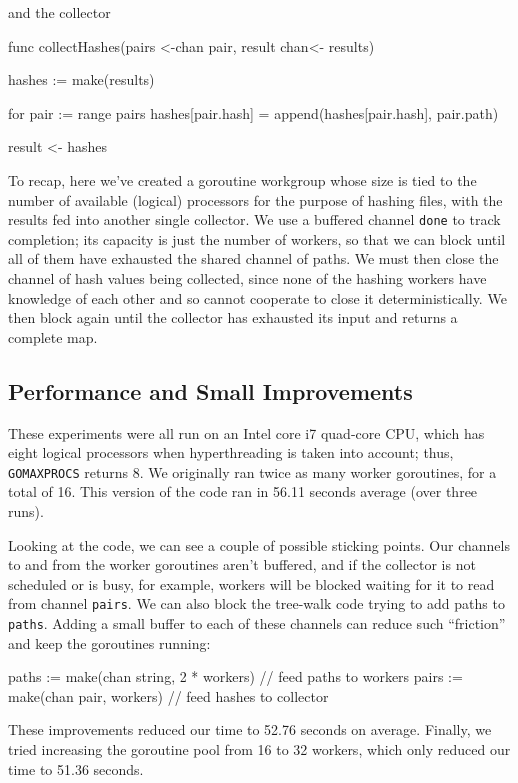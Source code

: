 \documentclass[12pt,notitlepage]{article}
\begin{document}
and the collector

\begin{golang}
func collectHashes(pairs <-chan pair, result chan<- results) {
	hashes := make(results)

	for pair := range pairs {
		hashes[pair.hash] = append(hashes[pair.hash], pair.path)
	}

	result <- hashes
}
\end{golang}

To recap, here we've created a goroutine workgroup whose size is tied to the
number of available (logical) processors for the purpose of hashing files, with
the results fed into another single collector. We use a buffered channel \verb|done|
to track completion; its capacity is just the number of workers, so that we can
block until all of them have exhausted the shared channel of paths. We must then
close the channel of hash values being collected, since none of the hashing workers
have knowledge of each other and so cannot cooperate to close it deterministically.
We then block again until the collector has exhausted its input and returns a
complete map.

\subsection{Performance and Small Improvements}
These experiments were all run on an Intel core i7 quad-core CPU, which has eight
logical processors when hyperthreading is taken into account; thus, \verb|GOMAXPROCS|
returns 8. We originally ran twice as many worker goroutines, for a total of 16.
This version of the code ran in 56.11 seconds average (over three runs).

Looking at the code, we can see a couple of possible sticking points. Our channels
to and from the worker goroutines aren't buffered, and if the collector is not
scheduled or is busy, for example, workers will be blocked waiting for it to
read from channel \verb|pairs|. We can also block the tree-walk code trying to
add paths to \verb|paths|. Adding a small buffer to each of these channels can
reduce such ``friction'' and keep the goroutines running:

\begin{golang}
	paths := make(chan string, 2 * workers) // feed paths to workers
	pairs := make(chan pair, workers)       // feed hashes to collector
\end{golang}

These improvements reduced our time to 52.76 seconds on average. Finally, we tried
increasing the goroutine pool from 16 to 32 workers, which only reduced our time to
51.36 seconds.
\end{document}
